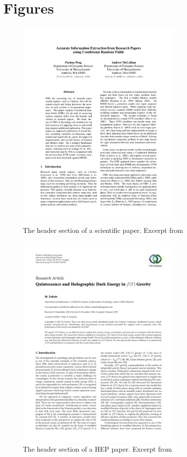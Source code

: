 
\chapter{Figures} %

\label{AppendixB} %


\begin{figure}[!ht]
\center
\includegraphics[width=3.25in]{Figures/header1.pdf}
\caption{The header section of a scientific paper. Excerpt from \cite{Peng04accurateinformation}}
\label{fig:header1}
\end{figure}

\begin{figure}[!ht]
\center
\includegraphics[width=3.25in]{Figures/header2.pdf}
\caption{The header section of a HEP paper. Excerpt from \cite{zubair2015quintessence}}
\label{fig:header2}
\end{figure}

